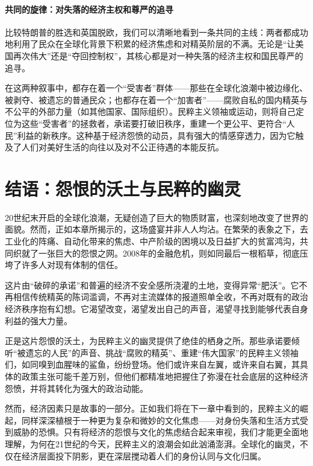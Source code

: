 \paragraph*{共同的旋律：对失落的经济主权和尊严的追寻}

比较特朗普的胜选和英国脱欧，我们可以清晰地看到一条共同的主线：两者都成功地利用了民众在全球化背景下积累的经济焦虑和对精英阶层的不满。无论是“让美国再次伟大”还是“夺回控制权”，其核心都是对一种失落的经济主权和国民尊严的追寻。

在这两种叙事中，都存在着一个“受害者”群体——那些在全球化浪潮中被边缘化、被剥夺、被遗忘的普通民众；也都存在着一个“加害者”——腐败自私的国内精英与不公平的外部力量（如其他国家、国际组织）。民粹主义领袖或运动，则将自己定位为这些“受害者”的拯救者，承诺要打破旧秩序，重建一个更公平、更符合“人民”利益的新秩序。这种基于经济怨愤的动员，具有强大的情感穿透力，因为它触及了人们对美好生活的向往以及对不公正待遇的本能反抗。

\section{结语：怨恨的沃土与民粹的幽灵}

20世纪末开启的全球化浪潮，无疑创造了巨大的物质财富，也深刻地改变了世界的面貌。然而，正如本章所揭示的，这场盛宴并非人人均沾。在繁荣的表象之下，去工业化的阵痛、自动化带来的焦虑、中产阶级的困境以及日益扩大的贫富鸿沟，共同织就了一张巨大的怨恨之网。2008年的金融危机，则如同最后一根稻草，彻底压垮了许多人对现有体制的信任。

这片由“破碎的承诺”和普遍的经济不安全感所浇灌的土地，变得异常“肥沃”。它不再相信传统精英的陈词滥调，不再对主流媒体的报道照单全收，不再对既有的政治经济秩序抱有幻想。它渴望改变，渴望发出自己的声音，渴望寻找到能够代表自身利益的强大力量。

正是这片怨恨的沃土，为民粹主义的幽灵提供了绝佳的栖身之所。那些承诺要倾听“被遗忘的人民”的声音、挑战“腐败的精英”、重建“伟大国家”的民粹主义领袖们，如同嗅到血腥味的鲨鱼，纷纷登场。他们或许来自左翼，或许来自右翼，其具体的政策主张可能千差万别，但他们都精准地把握住了弥漫在社会底层的这种经济怨愤，并将其转化为强大的政治动能。

然而，经济因素只是故事的一部分。正如我们将在下一章中看到的，民粹主义的崛起，同样深深植根于一种更为复杂和微妙的文化焦虑——对身份失落和生活方式受到威胁的恐惧。只有将经济的怨恨与文化的焦虑结合起来审视，我们才能更全面地理解，为何在21世纪的今天，民粹主义的浪潮会如此汹涌澎湃。全球化的幽灵，不仅在经济层面投下阴影，更在深层搅动着人们的身份认同与文化归属。
